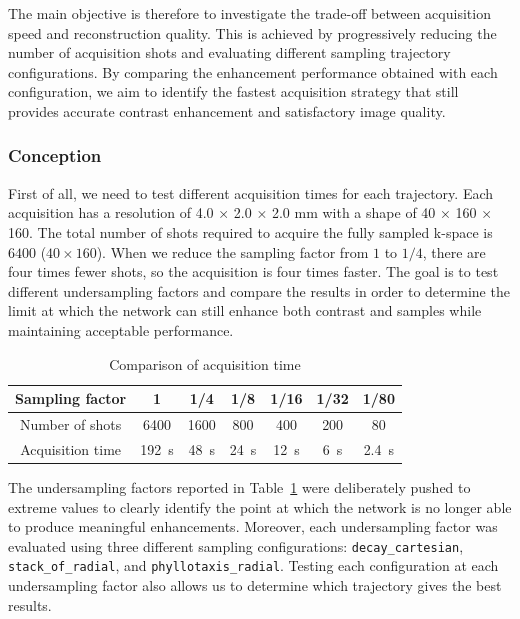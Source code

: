 \documentclass[12pt]{article}
\begin{document}
The main objective is therefore to investigate the trade-off between acquisition speed and reconstruction quality. 
This is achieved by progressively reducing the number of acquisition shots and evaluating different sampling trajectory configurations. 
By comparing the enhancement performance obtained with each configuration, we aim to identify the fastest acquisition strategy that still provides accurate contrast enhancement and satisfactory image quality.

\subsubsection{Conception}

First of all, we need to test different acquisition times for each trajectory.
Each acquisition has a resolution of 4.0 × 2.0 × 2.0 mm with a shape of 40 × 160 × 160.
The total number of shots required to acquire the fully sampled k-space is $6400$ ($40 \times 160$).
When we reduce the sampling factor from $1$ to $1/4$, there are four times fewer shots, so the acquisition is four times faster.
The goal is to test different undersampling factors and compare the results in order to determine the limit at which the network can still enhance both contrast and samples while maintaining acceptable performance.

\begin{table}[h]
\centering
\begin{tabular}{c c c c c c c}
\hline
Sampling factor & 1 & 1/4 & 1/8 & 1/16 & 1/32 & 1/80  \\
\hline
Number of shots & 6400 & 1600 & 800 & 400 & 200 & 80\\
Acquisition time & 192~s & 48~s & 24~s & 12~s & 6~s & 2.4~s  \\
\hline
\end{tabular}
\caption{Comparison of acquisition time}
\label{tab:comparison_acquisition_time}
\end{table}

The undersampling factors reported in Table~\ref{tab:comparison_acquisition_time} were deliberately pushed to extreme values to clearly identify the point at which the network is no longer able to produce meaningful enhancements.
Moreover, each undersampling factor was evaluated using three different sampling configurations: \texttt{decay\_cartesian}, \texttt{stack\_of\_radial}, and \texttt{phyllotaxis\_radial}.
Testing each configuration at each undersampling factor also allows us to determine which trajectory gives the best results.
\end{document}
